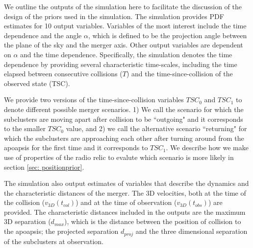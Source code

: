 We outline the outputs of the simulation here to facilitate the discussion
of the design of the priors used in the simulation. The simulation
provides PDF estimates for 10 output variables. Variables
of the most interest include the time dependence and the angle $\alpha$, which is
defined to be the projection angle between the plane of the sky and the merger axis. Other output variables are dependent on $\alpha$ and the time
dependence. Specifically, the simulation denotes the time dependence by
providing several characteristic time-scales, including the time
elapsed between consecutive collisions
($T$) and the time-since-collision of the observed state (TSC).  

We provide two versions of the time-since-collision variables $TSC_0$ and
$TSC_1$ to denote different possible merger scenarios. 1) We call the scenario for which the subclusters are
moving apart after collision to be ``outgoing" and it corresponds to the
smaller $TSC_0$ value, and 2) we call the alternative scenario 
``returning" for which the subclusters are approaching each other after turning
around from the apoapsis for the first time and it corresponds to $TSC_1$.
We describe how we make use of properties of the radio relic to evalute
which scenario is more likely in
section \ref{sec: positionprior}. 
 
The simulation also output estimates of variables that describe
the dynamics and the characteristic distances of the merger. The 3D velocities, both at the time of the
collision ($v_{3D}(t_{col})$) and at the time of observation
($v_{3D}(t_{obs})$) are provided. The characteristic
distances included in the outputs are the maximum 3D separation ($d_{max}$),
which is the distance between the position of collision to
the apoapsis; the projected separation $d_{proj}$ and the three
dimensional separation of the subclusters at observation. 

%


